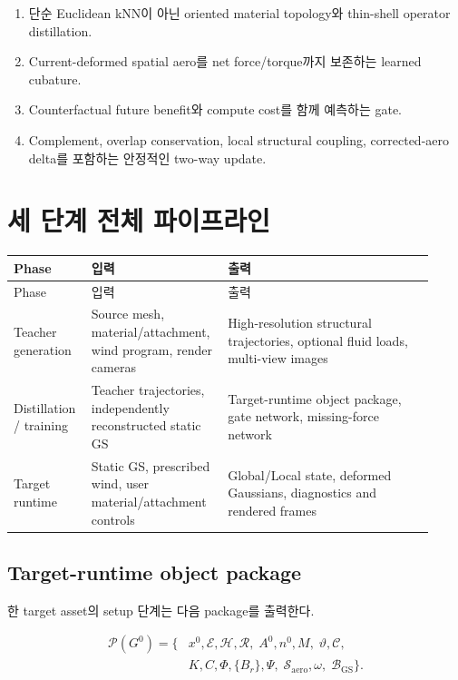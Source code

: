 \documentclass[11pt,a4paper]{article}
\begin{document}
\begin{enumerate}[leftmargin=1.7em]
  \item 단순 Euclidean kNN이 아닌 oriented material topology와 thin-shell operator distillation.
  \item Current-deformed spatial aero를 net force/torque까지 보존하는 learned cubature.
  \item Counterfactual future benefit와 compute cost를 함께 예측하는 gate.
  \item Complement, overlap conservation, local structural coupling,
  corrected-aero delta를 포함하는 안정적인 two-way update.
\end{enumerate}

\section{세 단계 전체 파이프라인}

\begin{longtable}{L{0.17\linewidth}L{0.28\linewidth}L{0.47\linewidth}}
\toprule
Phase & 입력 & 출력 \\
\midrule
\endfirsthead
\toprule
Phase & 입력 & 출력 \\
\midrule
\endhead
Teacher generation & Source mesh, material/attachment, wind program, render cameras & High-resolution structural trajectories, optional fluid loads, multi-view images \\
\addlinespace
Distillation / training & Teacher trajectories, independently reconstructed static GS & Target-runtime object package, gate network, missing-force network \\
\addlinespace
Target runtime & Static GS, prescribed wind, user material/attachment controls & Global/Local state, deformed Gaussians, diagnostics and rendered frames \\
\bottomrule
\end{longtable}

\subsection{Target-runtime object package}

한 target asset의 setup 단계는 다음 package를 출력한다.

\begin{equation}
\begin{aligned}
  \mathcal P(G^0)=\{&
  x^0,\mathcal E,\mathcal H,\mathcal R,\;
  A^0,n^0,M,\;
  \vartheta,\mathcal C,\\
  &K,C,\Phi,\{B_r\},\Psi,\;
  \mathcal S_{\mathrm{aero}},\omega,\;
  \mathcal B_{\mathrm{GS}}
  \}.
\end{aligned}
\end{equation}
\end{document}
